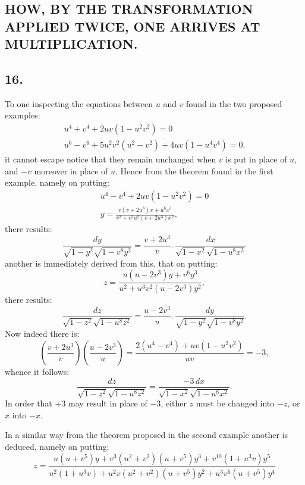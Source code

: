 \documentclass{article}
\begin{document}

\subsection*{HOW, BY THE TRANSFORMATION APPLIED TWICE, ONE ARRIVES AT MULTIPLICATION.}

\subsection*{16.}

To one inspecting the equations between $u$ and $v$ found in the two proposed examples:
\[
\begin{gathered}
u^{4}+v^{4}+2uv(1-u^{2}v^{2})=0\\
u^{6}-v^{6}+5u^{2}v^{2}(u^{2}-v^{2})+4uv(1-u^{4}v^{4})=0.
\end{gathered}
\]
it cannot escape notice that they remain unchanged when $v$ is put in place of $u$, and $-v$ moreover in place of $u$. Hence from the theorem found in the first example, namely on putting:
\[
\begin{gathered}
u^{4}-v^{4}+2uv(1-u^{2}v^{2})=0\\
y=\frac{v(v+2u^{3})x+u^{6}x^{3}}{v^{2}+v^{3}u^{2}(v+2u^{3})x^{2}},
\end{gathered}
\]
there results:
\[
\frac{dy}{\sqrt{1-y^{2}}\sqrt{1-v^{8}y^{2}}}=\frac{v+2u^{3}}{v}.\,\frac{dx}{\sqrt{1-x^{2}}\sqrt{1-u^{8}x^{2}}}
\]
another is immediately derived from this, that on putting:
\[
z=\frac{u(u-2v^{3})y+v^{6}y^{3}}{u^{2}+u^{3}v^{2}(u-2v^{3})y^{2}},
\]
there results:
\[
\frac{dz}{\sqrt{1-z^{2}}\sqrt{1-u^{8}z^{2}}}=\frac{u-2v^{3}}{u}.\,\frac{dy}{\sqrt{1-y^{2}}\sqrt{1-v^{8}y^{2}}}.
\]
Now indeed there is:
\[
\left(\frac{v+2u^{3}}{v}\right)\left(\frac{u-2v^{3}}{u}\right)=\frac{2(u^{4}-v^{4})+uv(1-u^{2}v^{2})}{uv}=-3,
\]
whence it follows:
\[
\frac{dz}{\sqrt{1-z^{2}}\sqrt{1-u^{8}z^{2}}}=\frac{-3\,dx}{\sqrt{1-x^{2}}\sqrt{1-u^{8}x^{2}}}.
\]
In order that $+3$ may result in place of $-3$, either $z$ must be changed into $-z$, or $x$ into $-x$.

In a similar way from the theorem proposed in the second example another is deduced, namely on putting:
\[
z=\frac{u(u+v^{5})y+v^{3}(u^{2}+v^{2})(u+v^{5})y^{3}+v^{10}(1+u^{3}v)y^{5}}{u^{2}(1+u^{3}v)+u^{2}v(u^{2}+v^{2})(u+v^{5})y^{2}+u^{3}v^{6}(u+v^{5})y^{4}}
\]
\end{document}
